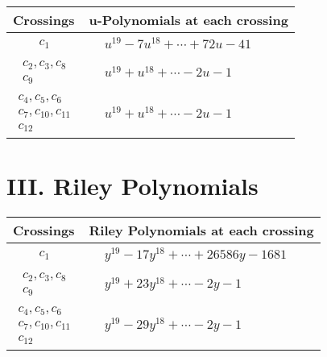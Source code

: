 \documentclass[1p]{elsarticle_modified}
\theoremstyle{definition}
\begin{document}
\begin{tabular}{m{50pt}|m{274pt}}
Crossings & \hspace{64pt}u-Polynomials at each crossing \\
\hline $$\begin{aligned}c_{1}\end{aligned}$$&$\begin{aligned}
&u^{19}-7 u^{18}+\cdots+72 u-41
\end{aligned}$\\
\hline $$\begin{aligned}c_{2},c_{3},c_{8}\\c_{9}\end{aligned}$$&$\begin{aligned}
&u^{19}+u^{18}+\cdots-2 u-1
\end{aligned}$\\
\hline $$\begin{aligned}c_{4},c_{5},c_{6}\\c_{7},c_{10},c_{11}\\c_{12}\end{aligned}$$&$\begin{aligned}
&u^{19}+u^{18}+\cdots-2 u-1
\end{aligned}$\\
\hline
\end{tabular}\newpage\renewcommand{\arraystretch}{1}
\centering \section*{ III. Riley Polynomials}
\begin{tabular}{m{50pt}|m{274pt}}
Crossings & \hspace{64pt}Riley Polynomials at each crossing \\
\hline $$\begin{aligned}c_{1}\end{aligned}$$&$\begin{aligned}
&y^{19}-17 y^{18}+\cdots+26586 y-1681
\end{aligned}$\\
\hline $$\begin{aligned}c_{2},c_{3},c_{8}\\c_{9}\end{aligned}$$&$\begin{aligned}
&y^{19}+23 y^{18}+\cdots-2 y-1
\end{aligned}$\\
\hline $$\begin{aligned}c_{4},c_{5},c_{6}\\c_{7},c_{10},c_{11}\\c_{12}\end{aligned}$$&$\begin{aligned}
&y^{19}-29 y^{18}+\cdots-2 y-1
\end{aligned}$\\
\hline
\end{tabular}
\vskip 2pc
\end{document}
